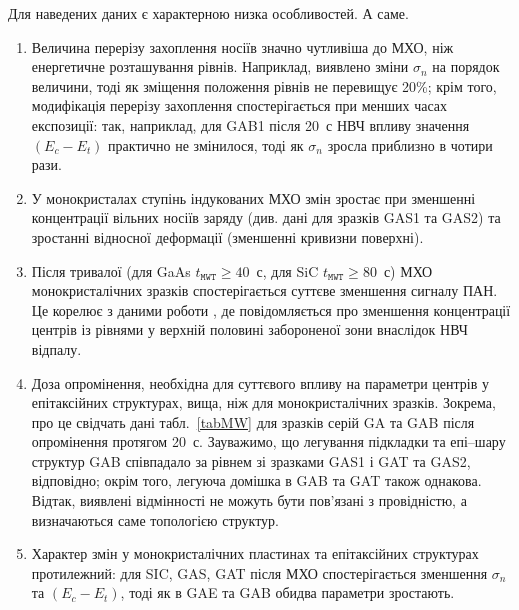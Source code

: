 Для наведених даних є характерною низка особливостей.
А саме.
\begin{enumerate}[label=\arabic*),leftmargin=0em,itemindent=1.5em]
\item Величина перерізу захоплення носіїв значно чутливіша до МХО, ніж енергетичне розташування рівнів.
Наприклад, виявлено зміни $\sigma_n$ на порядок величини, тоді як зміщення положення рівнів не перевищує 20\%;
крім того, модифікація перерізу захоплення спостерігається при менших часах експозиції: так, наприклад,
для GAB1 після 20~с НВЧ впливу значення $(E_c-E_t)$ практично не змінилося, тоді як $\sigma_n$ зросла приблизно в чотири рази.

\item У монокристалах ступінь індукованих МХО змін зростає при зменшенні концентрації вільних носіїв заряду (див. дані для зразків GAS1 та GAS2) та зростанні відносної деформації (зменшенні кривизни поверхні).

\item Після тривалої (для GaAs $t_\mathtt{MWT}\geq40$~с, для SiC $t_\mathtt{MWT}\geq80$~с) МХО монокристалічних
зразків спостерігається суттєве зменшення сигналу ПАН.
Це корелює з даними роботи \cite{Belyaev1998JTFr}, де повідомляється про зменшення концентрації центрів із
рівнями у верхній половині забороненої зони внаслідок НВЧ відпалу.

\item Доза опромінення, необхідна для суттєвого впливу на параметри центрів у епітаксійних структурах, вища, ніж
для монокристалічних зразків.
Зокрема, про це свідчать дані табл.~\ref{tabMW} для зразків серій GA та GAB після опромінення протягом 20~с.
Зауважимо, що легування підкладки та епі--шару структур GAB співпадало за рівнем зі зразками GAS1 і GAT та GAS2, відповідно; окрім того, легуюча домішка в GAB та GAT також однакова.
Відтак, виявлені відмінності не можуть бути пов'язані з провідністю, а визначаються саме топологією структур.

\item Характер змін у монокристалічних пластинах та епітаксійних структурах протилежний:
для SIC, GAS, GAT після МХО спостерігається зменшення $\sigma_n$ та $(E_c-E_t)$, тоді як в GAE та GAB обидва параметри зростають.
\end{enumerate}


